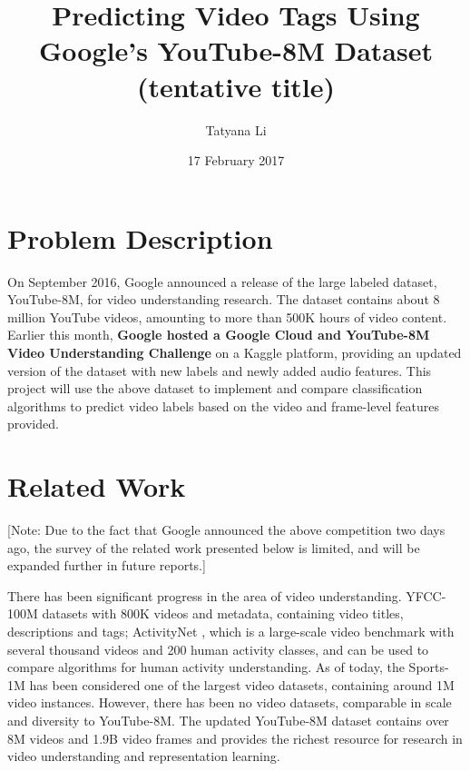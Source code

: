 \documentclass{sig-alternate-05-2015}
\begin{document}

\title{Predicting Video Tags Using Google's YouTube-8M Dataset (tentative title)}

\author{
Tatyana Li \\
}
\date{17 February 2017}

\maketitle

\section{Problem Description}
On September 2016, Google announced a release of the large labeled dataset, YouTube-8M, for video understanding research. The dataset contains about 8 million YouTube videos, amounting to more than 500K hours of video content. Earlier this month, \textbf{Google hosted a Google Cloud and YouTube-8M Video Understanding Challenge} on a Kaggle platform, providing an updated version of the dataset with new labels and newly added audio features. 
This project will use the above dataset to implement and compare classification algorithms to predict video labels based on the video and frame-level features provided.

\section{Related Work}
[Note: Due to the fact that Google announced the above competition two days ago, the survey of the related work presented below is limited, and will be expanded further in future reports.] 

There has been significant progress in the area of video understanding. YFCC-100M datasets \cite{1} with 800K videos and metadata, containing video titles, descriptions and tags; ActivityNet \cite{2}, which is a large-scale video benchmark with several thousand videos and 200 human activity classes, and can be used to compare algorithms for human activity understanding. As of today, the Sports-1M \cite{3} has been considered one of the largest video datasets, containing around 1M video instances. 
However, there has been no video datasets, comparable in scale and diversity to YouTube-8M. The updated YouTube-8M dataset contains over 8M videos and 1.9B video frames and provides the richest resource for research in video understanding and representation learning.
\end{document}
